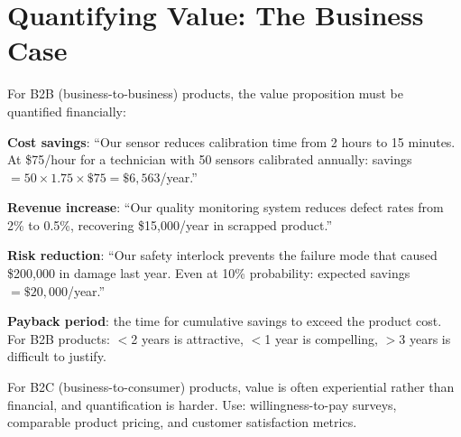 \section{Quantifying Value: The Business Case}
For B2B (business-to-business) products, the value proposition must be quantified financially:

\textbf{Cost savings}: ``Our sensor reduces calibration time from 2 hours to 15 minutes. At \$75/hour for a technician with 50 sensors calibrated annually: savings $= 50 \times 1.75 \times \$75 = \$6{,}563$/year.''

\textbf{Revenue increase}: ``Our quality monitoring system reduces defect rates from 2\% to 0.5\%, recovering \$15{,}000/year in scrapped product.''

\textbf{Risk reduction}: ``Our safety interlock prevents the failure mode that caused \$200{,}000 in damage last year. Even at 10\% probability: expected savings $= \$20{,}000$/year.''

\textbf{Payback period}: the time for cumulative savings to exceed the product cost. For B2B products: $<$2 years is attractive, $<$1 year is compelling, $>$3 years is difficult to justify.

For B2C (business-to-consumer) products, value is often experiential rather than financial, and quantification is harder. Use: willingness-to-pay surveys, comparable product pricing, and customer satisfaction metrics.
